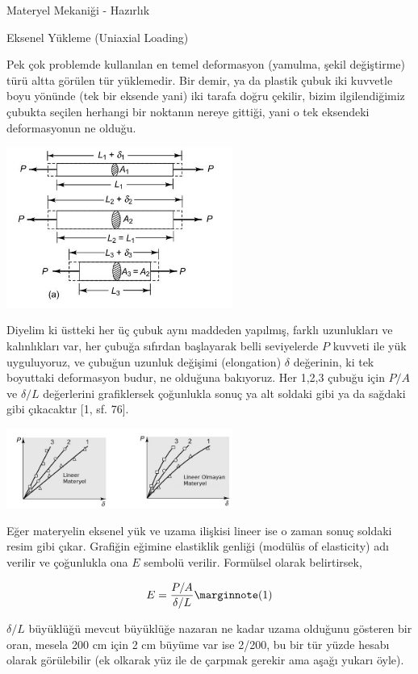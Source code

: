 \documentclass[12pt,fleqn]{article}\usepackage{../../common}
\begin{document}
Materyel Mekaniği - Hazırlık

Eksenel Yükleme (Uniaxial Loading)

Pek çok problemde kullanılan en temel deformasyon (yamulma, şekil değiştirme)
türü altta görülen tür yüklemedir. Bir demir, ya da plastik çubuk iki kuvvetle
boyu yönünde (tek bir eksende yani) iki tarafa doğru çekilir, bizim
ilgilendiğimiz çubukta seçilen herhangi bir noktanın nereye gittiği, yani o tek
eksendeki deformasyonun ne olduğu.

\includegraphics[width=20em]{phy_020_strs_00_01.jpg}

Diyelim ki üstteki her üç çubuk aynı maddeden yapılmış, farklı uzunlukları ve
kalınlıkları var, her çubuğa sıfırdan başlayarak belli seviyelerde $P$ kuvveti
ile yük uyguluyoruz, ve çubuğun uzunluk değişimi (elongation) $\delta$
değerinin, ki tek boyuttaki deformasyon budur, ne olduğuna bakıyoruz. Her 1,2,3
çubuğu için $P/A$ ve $\delta/L$ değerlerini grafiklersek çoğunlukla sonuç ya alt
soldaki gibi ya da sağdaki gibi çıkacaktır [1, sf. 76].

\includegraphics[width=20em]{phy_020_strs_00_02.jpg}

Eğer materyelin eksenel yük ve uzama ilişkisi lineer ise o zaman sonuç soldaki
resim gibi çıkar. Grafiğin eğimine elastiklik genliği (modülüs of elasticity)
adı verilir ve çoğunlukla ona $E$ sembolü verilir. Formülsel olarak belirtirsek,

$$
E = \frac{P/A}{\delta / L}
\mlabel{1}
$$

$\delta/L$ büyüklüğü mevcut büyüklüğe nazaran ne kadar uzama olduğunu gösteren
bir oran, mesela 200 cm için 2 cm büyüme var ise 2/200, bu bir tür yüzde hesabı
olarak görülebilir (ek olkarak yüz ile de çarpmak gerekir ama aşağı yukarı öyle).
\end{document}

